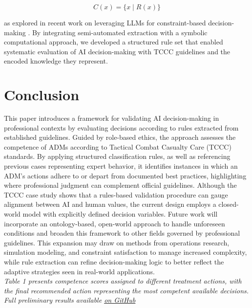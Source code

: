 \documentclass[conference]{IEEEtran}
\begin{document}
\[
C(x) = \{x \mid R(x)\}
\]

as explored in recent work on leveraging LLMs for constraint-based decision-making \cite{hotz2024llm, regin_combining_2024}. By integrating semi-automated extraction with a symbolic computational approach, we developed a structured rule set that enabled systematic evaluation of AI decision-making with TCCC guidelines and the encoded knowledge they represent.


\section{Conclusion}
\label{sec:conclusion}
This paper introduces a framework for validating AI decision-making in professional contexts by evaluating decisions according to rules extracted from established guidelines. Guided by role-based ethics, the approach assesses the competence of ADMs according to Tactical Combat Casualty Care (TCCC) standards. By applying structured classification rules, as well as referencing previous cases representing expert behavior, it identifies instances in which an ADM's actions adhere to or depart from documented best practices, highlighting where professional judgment can complement official guidelines. Although the TCCC case study shows that a rules-based validation procedure can gauge alignment between AI and human values, the current design employs a closed-world model with explicitly defined decision variables. Future work will incorporate an ontology-based, open-world approach to handle unforeseen conditions and broaden this framework to other fields governed by professional guidelines. This expansion may draw on methods from operations research, simulation modeling, and constraint satisfaction to manage increased complexity, while rule extraction can refine decision-making logic to better reflect the adaptive strategies seen in real-world applications.
\\

\textit{
Table 1 presents competence scores assigned to different treatment actions, with the final recommended action representing the most competent available decisions. Full preliminary results available \href{hhttps://github.com/cr625/ITM_Alignment/blob/main/ouput.md}{on GitHub}}
\end{document}
